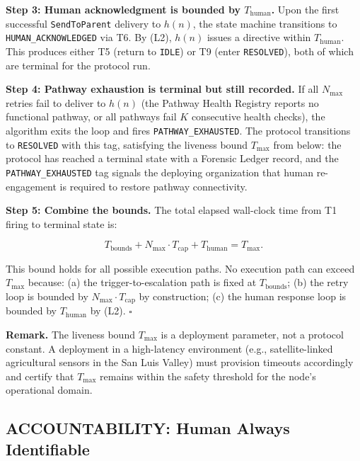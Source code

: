 \medskip
\noindent\textbf{Step 3: Human acknowledgment is bounded by $T_{\text{human}}$.} Upon the first successful \texttt{SendToParent} delivery to $h(n)$, the state machine transitions to \texttt{HUMAN\_ACKNOWLEDGED} via T6. By (L2), $h(n)$ issues a directive within $T_{\text{human}}$. This produces either T5 (return to \texttt{IDLE}) or T9 (enter \texttt{RESOLVED}), both of which are terminal for the protocol run.

\medskip
\noindent\textbf{Step 4: Pathway exhaustion is terminal but still recorded.} If all $N_{\max}$ retries fail to deliver to $h(n)$ (the Pathway Health Registry reports no functional pathway, or all pathways fail $K$ consecutive health checks), the algorithm exits the loop and fires \texttt{PATHWAY\_EXHAUSTED}. The protocol transitions to \texttt{RESOLVED} with this tag, satisfying the liveness bound $T_{\max}$ from below: the protocol has reached a terminal state with a Forensic Ledger record, and the \texttt{PATHWAY\_EXHAUSTED} tag signals the deploying organization that human re-engagement is required to restore pathway connectivity.

\medskip
\noindent\textbf{Step 5: Combine the bounds.} The total elapsed wall-clock time from T1 firing to terminal state is:

\[
T_{\text{bounds}} + N_{\max} \cdot T_{\text{cap}} + T_{\text{human}} = T_{\max}.
\]

This bound holds for all possible execution paths. No execution path can exceed $T_{\max}$ because: (a) the trigger-to-escalation path is fixed at $T_{\text{bounds}}$; (b) the retry loop is bounded by $N_{\max} \cdot T_{\text{cap}}$ by construction; (c) the human response loop is bounded by $T_{\text{human}}$ by (L2). $\square$

\medskip
\noindent\textbf{Remark.} The liveness bound $T_{\max}$ is a deployment parameter, not a protocol constant. A deployment in a high-latency environment (e.g., satellite-linked agricultural sensors in the San Luis Valley) must provision timeouts accordingly and certify that $T_{\max}$ remains within the safety threshold for the node's operational domain.

\subsection{ACCOUNTABILITY: Human Always Identifiable}

